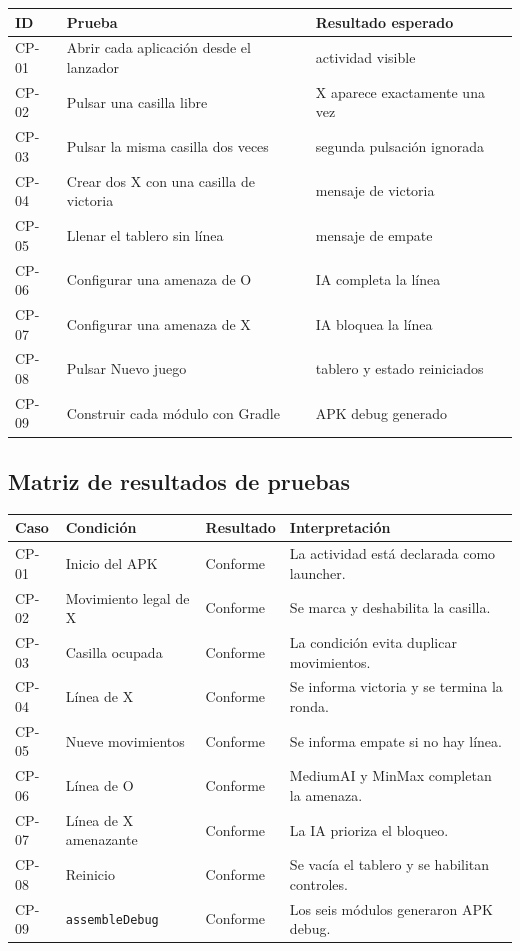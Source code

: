 \documentclass[stu,a4paper,12pt,floatsintext]{apa7}
\begin{document}
\begin{longtable}{p{}p{}p{}}
\toprule
\textbf{ID} & \textbf{Prueba} & \textbf{Resultado esperado}\\
\midrule
CP-01 & Abrir cada aplicación desde el lanzador & actividad visible\\
CP-02 & Pulsar una casilla libre & X aparece exactamente una vez\\
CP-03 & Pulsar la misma casilla dos veces & segunda pulsación ignorada\\
CP-04 & Crear dos X con una casilla de victoria & mensaje de victoria\\
CP-05 & Llenar el tablero sin línea & mensaje de empate\\
CP-06 & Configurar una amenaza de O & IA completa la línea\\
CP-07 & Configurar una amenaza de X & IA bloquea la línea\\
CP-08 & Pulsar Nuevo juego & tablero y estado reiniciados\\
CP-09 & Construir cada módulo con Gradle & APK debug generado\\
\bottomrule
\end{longtable}

\subsection{Matriz de resultados de pruebas}
\begin{longtable}{p{}p{}p{}p{}}
\toprule
\textbf{Caso} & \textbf{Condición} & \textbf{Resultado} & \textbf{Interpretación}\\
\midrule
CP-01 & Inicio del APK & Conforme & La actividad está declarada como launcher.\\
CP-02 & Movimiento legal de X & Conforme & Se marca y deshabilita la casilla.\\
CP-03 & Casilla ocupada & Conforme & La condición evita duplicar movimientos.\\
CP-04 & Línea de X & Conforme & Se informa victoria y se termina la ronda.\\
CP-05 & Nueve movimientos & Conforme & Se informa empate si no hay línea.\\
CP-06 & Línea de O & Conforme & MediumAI y MinMax completan la amenaza.\\
CP-07 & Línea de X amenazante & Conforme & La IA prioriza el bloqueo.\\
CP-08 & Reinicio & Conforme & Se vacía el tablero y se habilitan controles.\\
CP-09 & \texttt{assembleDebug} & Conforme & Los seis módulos generaron APK debug.\\
\bottomrule
\end{longtable}
\end{document}
